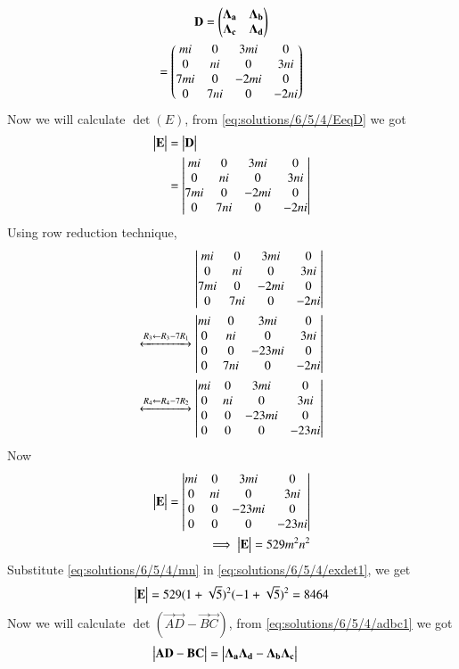 \begin{multline}
    \mathbf{D}=\begin{pmatrix}\mathbf{\Lambda_a} & \mathbf{\Lambda_b}\\\mathbf{\Lambda_c} & \mathbf{\Lambda_d}\end{pmatrix}\\
    =\begin{pmatrix}mi&0&3mi&0\\0&ni&0&3ni\\7mi&0&-2mi&0\\0&7ni&0&-2ni\end{pmatrix}
\end{multline}
Now we will calculate $\det(E)$, from \eqref{eq:solutions/6/5/4/EeqD} we got
\begin{align}
    \begin{vmatrix}\mathbf{E}\end{vmatrix}&=\begin{vmatrix}\mathbf{D}\end{vmatrix}\\
    &=\begin{vmatrix}mi&0&3mi&0\\0&ni&0&3ni\\7mi&0&-2mi&0\\0&7ni&0&-2ni\end{vmatrix}
\end{align}
Using row reduction technique,
\begin{align}
    \begin{vmatrix}mi&0&3mi&0\\0&ni&0&3ni\\7mi&0&-2mi&0\\0&7ni&0&-2ni\end{vmatrix}\\
    \xleftrightarrow[]{R_3\leftarrow R_3-7R_1}\begin{vmatrix}mi&0&3mi&0\\0&ni&0&3ni\\0&0&-23mi&0\\0&7ni&0&-2ni\end{vmatrix}\\
    \xleftrightarrow[]{R_4\leftarrow R_4-7R_2}\begin{vmatrix}mi&0&3mi&0\\0&ni&0&3ni\\0&0&-23mi&0\\0&0&0&-23ni\end{vmatrix}
\end{align}
Now
\begin{align}
    \begin{vmatrix}\mathbf{E}\end{vmatrix}=\begin{vmatrix}mi&0&3mi&0\\0&ni&0&3ni\\0&0&-23mi&0\\0&0&0&-23ni\end{vmatrix}\\
    \implies\begin{vmatrix}\mathbf{E}\end{vmatrix}=529m^2n^2\label{eq:solutions/6/5/4/exdet1}
\end{align}
Substitute \eqref{eq:solutions/6/5/4/mn} in \eqref{eq:solutions/6/5/4/exdet1}, we get
\begin{align}
    \begin{vmatrix}\mathbf{E}\end{vmatrix}=529(1+\sqrt{5})^2(-1+\sqrt{5})^2=8464\label{eq:solutions/6/5/4/exdetfin}
\end{align}
Now we will calculate $\det(\vec{A}\vec{D}-\vec{B}\vec{C})$, from \eqref{eq:solutions/6/5/4/adbc1} we got
\begin{align}
    \begin{vmatrix}\mathbf{A}\mathbf{D}-\mathbf{B}\mathbf{C}\end{vmatrix}&=\begin{vmatrix}\mathbf{\Lambda_a}\mathbf{\Lambda_d}-\mathbf{\Lambda_b}\mathbf{\Lambda_c}\end{vmatrix}\label{eq:solutions/6/5/4/exadbc1}
\end{align}
